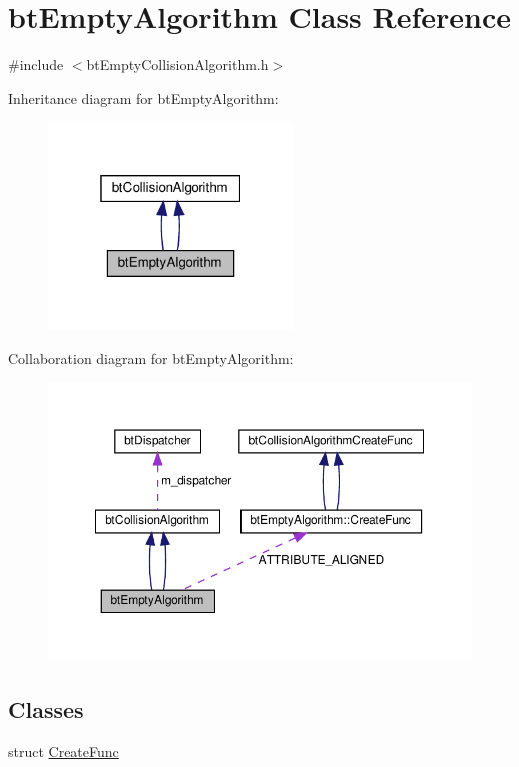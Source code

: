 \hypertarget{classbtEmptyAlgorithm}{}\section{bt\+Empty\+Algorithm Class Reference}
\label{classbtEmptyAlgorithm}


{\ttfamily \#include $<$bt\+Empty\+Collision\+Algorithm.\+h$>$}



Inheritance diagram for bt\+Empty\+Algorithm\+:
\nopagebreak
\begin{figure}[H]
\begin{center}
\leavevmode
\includegraphics[width=184pt]{classbtEmptyAlgorithm__inherit__graph}
\end{center}
\end{figure}


Collaboration diagram for bt\+Empty\+Algorithm\+:
\nopagebreak
\begin{figure}[H]
\begin{center}
\leavevmode
\includegraphics[width=350pt]{classbtEmptyAlgorithm__coll__graph}
\end{center}
\end{figure}
\subsection*{Classes}
\begin{DoxyCompactItemize}
\item 
struct \hyperlink{structbtEmptyAlgorithm_1_1CreateFunc}{Create\+Func}
\end{DoxyCompactItemize}
